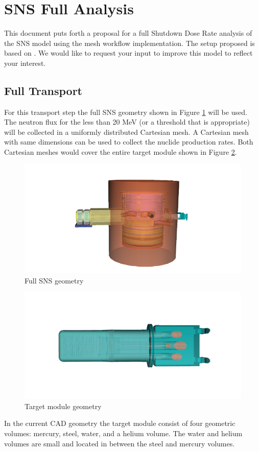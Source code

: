 \section{SNS Full Analysis}

This document puts forth a proposal for a full Shutdown Dose Rate analysis
of the SNS model using the mesh workflow implementation.
The setup proposed is based on \cite{SNS2018}. We would like to request your input
to improve this model to reflect your interest.

\subsection{Full Transport}
For this transport step the full SNS geometry shown in Figure
\ref{fig:sns_full_geom} will be used.
The neutron flux for the less than
20 MeV (or a threshold that is appropriate) will be collected in a
uniformly distributed Cartesian mesh. A Cartesian mesh with same
dimensions can be used to collect the nuclide production rates. 
Both Cartesian meshes would cover the entire target module shown in Figure
\ref{fig:sns_target}.

\begin{figure}[ht!]
	\centering
	\includegraphics[scale=0.3,trim={3cm 0.5cm 4.5cm 1cm},clip]{figs/SNS_full.png}
	\caption{Full SNS geometry}
	\label{fig:sns_full_geom}
\end{figure}

\begin{figure}[ht!]
	\centering
	\includegraphics[scale=0.3,trim={3cm 0.5cm 4.5cm 1cm},clip]{figs/SNS_target.png}
	\caption{Target module geometry}
	\label{fig:sns_target}
\end{figure}
In the current CAD geometry the target module consist of four geometric
volumes: mercury, steel, water, and a helium volume.
The water and helium volumes are small and located in between the steel
and mercury volumes.

